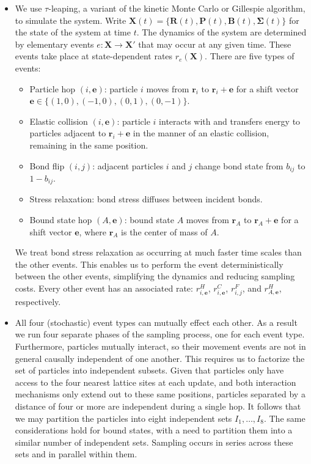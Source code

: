 \documentclass[12pt,letterpaper]{article}
\newcommand{\mb}{\mathbf}
\begin{document}
\begin{itemize}
giving $\mu_{1} = 1 - e^{\mu_{2}}$. The mass-coupled field $\mb{F}_{mass}$ is a uniform field modeled after gravitation. Fixing a constant $g$, we set
\begin{align*}
\mb{F}_{mass}(\mb{r}) = g
\end{align*}
everywhere. The constant $g$ should be set such that in general $q\mb{F}_{charge}$ dwarfs $m\mb{F}_{mass}$ unless $m$ is much larger than $q$, although one could also consider alternative schemes.
\item We use $\tau$-leaping, a variant of the kinetic Monte Carlo or Gillespie algorithm, to simulate the system. Write $\mb{X}(t) = \{\mb{R}(t), \mb{P}(t), \mb{B}(t), \boldsymbol{\Sigma}(t)\}$ for the state of the system at time $t$. The dynamics of the system are determined by elementary events $e: \mb{X} \rightarrow \mb{X}'$ that may occur at any given time. These events take place at state-dependent rates $r_{e}(\mb{X})$. There are five types of events:
\begin{itemize}
\item[--] Particle hop $(i, \mb{e})$: particle $i$ moves from $\mb{r}_{i}$ to $\mb{r}_{i} + \mb{e}$ for a shift vector $\mb{e} \in \{(1, 0), (-1, 0), (0, 1), (0, -1)\}$.
\item[--] Elastic collision $(i, \mb{e})$: particle $i$ interacts with and transfers energy to particles adjacent to $\mb{r}_{i} + \mb{e}$ in the manner of an elastic collision, remaining in the same position.
\item[--] Bond flip $(i, j)$: adjacent particles $i$ and $j$ change bond state from $b_{ij}$ to $1 - b_{ij}$.
\item[--] Stress relaxation: bond stress diffuses between incident bonds.
\item[--] Bound state hop $(A, \mb{e})$: bound state $A$ moves from $\mb{r}_{A}$ to $\mb{r}_{A} + \mb{e}$ for a shift vector $\mb{e}$, where $\mb{r}_{A}$ is the center of mass of $A$.
\end{itemize}
We treat bond stress relaxation as occurring at much faster time scales than the other events. This enables us to perform the event deterministically between the other events, simplifying the dynamics and reducing sampling costs. Every other event has an associated rate: $r^{H}_{i,\mb{e}}$, $r^{C}_{i,\mb{e}}$, $r^{F}_{i,j}$, and $r^{H}_{A,\mb{e}}$, respectively.
\item All four (stochastic) event types can mutually effect each other. As a result we run four separate phases of the sampling process, one for each event type. Furthermore, particles mutually interact, so their movement events are not in general causally independent of one another. This requires us to factorize the set of particles into independent subsets. Given that particles only have access to the four nearest lattice sites at each update, and both interaction mechanisms only extend out to these same positions, particles separated by a distance of four or more are independent during a single hop. It follows that we may partition the particles into eight independent sets $I_{1}, \ldots, I_{8}$. The same considerations hold for bound states, with a need to partition them into a similar number of independent sets. Sampling occurs in series across these sets and in parallel within them.

\end{itemize}
\end{document}
